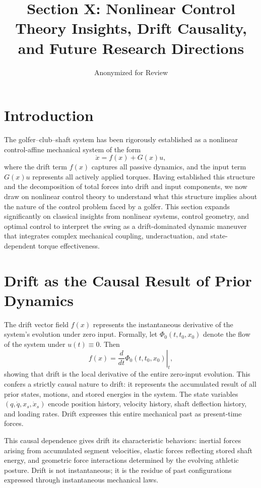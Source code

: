 \documentclass[12pt]{article}
\title{Section X: Nonlinear Control Theory Insights, Drift Causality, and Future Research Directions}
\author{Anonymized for Review}
\date{}
\begin{document}
\maketitle

\section{Introduction}

The golfer--club--shaft system has been rigorously established as a nonlinear control-affine mechanical system of the form
\begin{equation}
\dot{x} = f(x) + G(x)u,
\end{equation}
where the drift term $f(x)$ captures all passive dynamics, and the input term $G(x)u$ represents all actively applied torques. Having established this structure and the decomposition of total forces into drift and input components, we now draw on nonlinear control theory to understand what this structure implies about the nature of the control problem faced by a golfer. This section expands significantly on classical insights from nonlinear systems, control geometry, and optimal control to interpret the swing as a drift-dominated dynamic maneuver that integrates complex mechanical coupling, underactuation, and state-dependent torque effectiveness.

\section{Drift as the Causal Result of Prior Dynamics}

The drift vector field $f(x)$ represents the instantaneous derivative of the system's evolution under zero input. Formally, let $\Phi_0(t, t_0, x_0)$ denote the flow of the system under $u(t) \equiv 0$. Then
\begin{equation}
f(x) = \left.\frac{d}{dt}\Phi_0(t, t_0, x_0)\right|_t,
\end{equation}
showing that drift is the local derivative of the entire zero-input evolution. This confers a strictly causal nature to drift: it represents the accumulated result of all prior states, motions, and stored energies in the system. The state variables $(q, \dot{q}, x_s, \dot{x}_s)$ encode position history, velocity history, shaft deflection history, and loading rates. Drift expresses this entire mechanical past as present-time forces.

This causal dependence gives drift its characteristic behaviors: inertial forces arising from accumulated segment velocities, elastic forces reflecting stored shaft energy, and geometric force interactions determined by the evolving athletic posture. Drift is not instantaneous; it is the residue of past configurations expressed through instantaneous mechanical laws.
\end{document}

